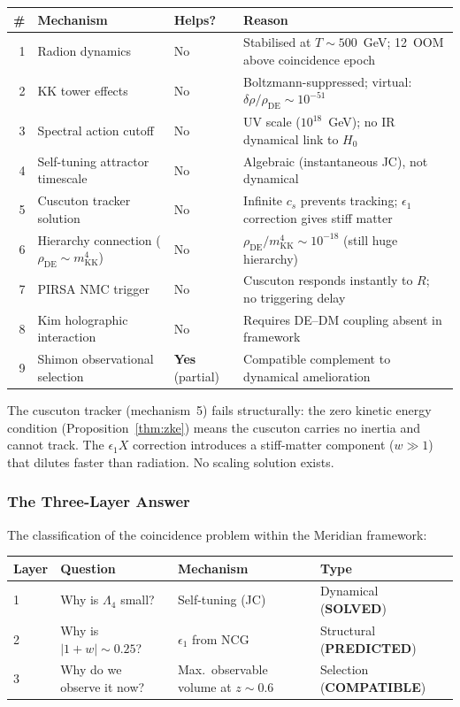 \begin{center}
\small
\begin{tabular}{r l l l}
\hline
\# & Mechanism & Helps? & Reason \\
\hline
1 & Radion dynamics               & No & Stabilised at $T \sim 500$~GeV; 12~OOM above coincidence epoch \\
2 & KK tower effects              & No & Boltzmann-suppressed; virtual: $\delta\rho/\rho_{\mathrm{DE}} \sim 10^{-51}$ \\
3 & Spectral action cutoff          & No & UV scale ($10^{18}$~GeV); no IR dynamical link to $H_0$ \\
4 & Self-tuning attractor timescale & No & Algebraic (instantaneous JC), not dynamical \\
5 & Cuscuton tracker solution       & No & Infinite $c_s$ prevents tracking; $\epsilon_1$ correction gives stiff matter \\
6 & Hierarchy connection ($\rho_{\mathrm{DE}} \sim m_{\mathrm{KK}}^4$) & No & $\rho_{\mathrm{DE}}/m_{\mathrm{KK}}^4 \sim 10^{-18}$ (still huge hierarchy) \\
7 & PIRSA NMC trigger               & No & Cuscuton responds instantly to $R$; no triggering delay \\
8 & Kim holographic interaction      & No & Requires DE--DM coupling absent in framework \\
9 & Shimon observational selection   & \textbf{Yes} (partial) & Compatible complement to dynamical amelioration \\
\hline
\end{tabular}
\end{center}

\noindent
The cuscuton tracker (mechanism~5) fails structurally: the zero kinetic energy condition (Proposition~\ref{thm:zke}) means the cuscuton carries no inertia and cannot track. The $\epsilon_1 X$ correction introduces a stiff-matter component ($w \gg 1$) that dilutes faster than radiation. No scaling solution exists.

\subsubsection{The Three-Layer Answer}

The classification of the coincidence problem within the Meridian framework:

\begin{center}
\begin{tabular}{l l l l}
\hline
Layer & Question & Mechanism & Type \\
\hline
1 & Why is $\Lambda_4$ small? & Self-tuning (JC) & Dynamical (\textbf{SOLVED}) \\
2 & Why is $|1+w| \sim 0.25$? & $\epsilon_1$ from NCG & Structural (\textbf{PREDICTED}) \\
3 & Why do we observe it now? & Max.\ observable volume at $z \sim 0.6$ & Selection (\textbf{COMPATIBLE}) \\
\hline
\end{tabular}
\end{center}

